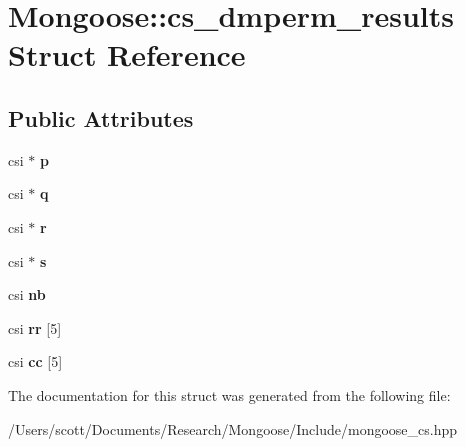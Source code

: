 \hypertarget{struct_mongoose_1_1cs__dmperm__results}{}\section{Mongoose\+:\+:cs\+\_\+dmperm\+\_\+results Struct Reference}
\label{struct_mongoose_1_1cs__dmperm__results}
\subsection*{Public Attributes}
\begin{DoxyCompactItemize}
\item 
csi $\ast$ {\bfseries p}\hypertarget{struct_mongoose_1_1cs__dmperm__results_ac73b3722f53bfafe910cd7cac151c84e}{}\label{struct_mongoose_1_1cs__dmperm__results_ac73b3722f53bfafe910cd7cac151c84e}

\item 
csi $\ast$ {\bfseries q}\hypertarget{struct_mongoose_1_1cs__dmperm__results_ac53565f1f9cc4f9ad42a4d0d0fc759d4}{}\label{struct_mongoose_1_1cs__dmperm__results_ac53565f1f9cc4f9ad42a4d0d0fc759d4}

\item 
csi $\ast$ {\bfseries r}\hypertarget{struct_mongoose_1_1cs__dmperm__results_a153cf8c996863e8003cf11f452c453e2}{}\label{struct_mongoose_1_1cs__dmperm__results_a153cf8c996863e8003cf11f452c453e2}

\item 
csi $\ast$ {\bfseries s}\hypertarget{struct_mongoose_1_1cs__dmperm__results_a5208fdeb0147a3b75d721248d60efa87}{}\label{struct_mongoose_1_1cs__dmperm__results_a5208fdeb0147a3b75d721248d60efa87}

\item 
csi {\bfseries nb}\hypertarget{struct_mongoose_1_1cs__dmperm__results_aeefa353a17e422c1f949949c90b7aeee}{}\label{struct_mongoose_1_1cs__dmperm__results_aeefa353a17e422c1f949949c90b7aeee}

\item 
csi {\bfseries rr} \mbox{[}5\mbox{]}\hypertarget{struct_mongoose_1_1cs__dmperm__results_a1c68d111650710119ef59c83c995af3a}{}\label{struct_mongoose_1_1cs__dmperm__results_a1c68d111650710119ef59c83c995af3a}

\item 
csi {\bfseries cc} \mbox{[}5\mbox{]}\hypertarget{struct_mongoose_1_1cs__dmperm__results_a0cb56ec389b8cd56fbb13cb853eca2d1}{}\label{struct_mongoose_1_1cs__dmperm__results_a0cb56ec389b8cd56fbb13cb853eca2d1}

\end{DoxyCompactItemize}


The documentation for this struct was generated from the following file\+:\begin{DoxyCompactItemize}
\item 
/\+Users/scott/\+Documents/\+Research/\+Mongoose/\+Include/mongoose\+\_\+cs.\+hpp\end{DoxyCompactItemize}
